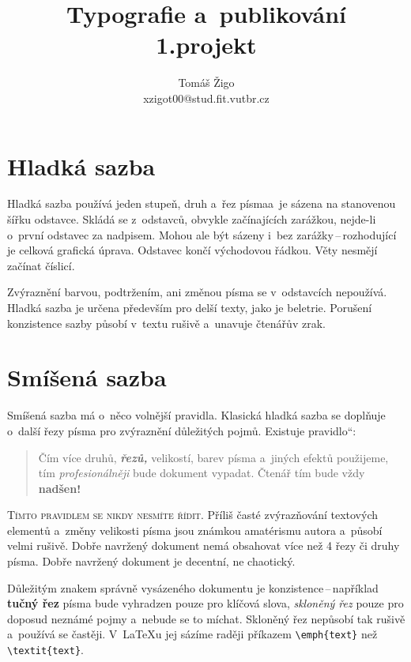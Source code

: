 \documentclass[a4paper, twocolumn, 10pt]{article}[23.02.2018]
\title{Typografie a~publikování \\{\large 1.projekt}}
\author{Tomáš Žigo \\xzigot00@stud.fit.vutbr.cz}
\date{}
\newcommand{\myuv}[1]{\quotedblbase #1\textquotedblleft}
\begin{document}
\maketitle

\section{Hladká sazba}

Hladká sazba používá jeden stupeň, druh a~řez písma\linebreak a~je sázena na stanovenou šířku odstavce. Skládá se z~odstavců, obvykle začínajících zarážkou, nejde-li o~první odstavec za nadpisem. Mohou ale být sázeny i~bez zarážky\,--\,rozhodující je celková grafická úprava. Odstavec končí východovou řádkou. Věty nesmějí začínat číslicí.

Zvýraznění barvou, podtržením, ani změnou písma se v~odstavcích nepoužívá. Hladká sazba je určena především pro delší texty, jako je beletrie. Porušení konzistence sazby působí v~textu rušivě a~unavuje čtenářův zrak.

\section{Smíšená sazba}
\label{a}
Smíšená sazba má o~něco volnější pravidla. Klasická hladká sazba se doplňuje o~další řezy písma pro zvýraznění důležitých pojmů. Existuje \myuv{pravidlo}:

\begin{quotation}
Čím více {\ttfamily druhů,} \textit{\textbf{řezů,}} {\small velikostí}, barev písma {\selectfont a~jiných efektů} použijeme, tím \textit{profesionálněji} bude dokument vypadat. Čtenář tím {\tiny bude} vždy \textbf{{\huge nadšen!}}
\end{quotation}

\textsc{Tímto pravidlem se nikdy nesmíte řídit.} Příliš časté zvýrazňování textových elementů a~změny velikosti písma jsou známkou amatérismu autora a~působí velmi rušivě. Dobře navržený dokument nemá obsahovat více než
4 řezy či druhy písma. Dobře navržený dokument je decentní, ne chaotický.

Důležitým znakem správně vysázeného dokumentu je konzistence\,--\,například \textbf{tučný řez} písma bude vyhradzen pouze pro klíčová slova, \textit{skloněný řez} pouze pro doposud neznámé pojmy a~nebude se to míchat. Skloněný řez nepůsobí tak rušivě a~používá se častěji. V~\LaTeX u jej sázíme raději příkazem \verb|\emph{text}| než \verb|\textit{text}|.
\end{document}
